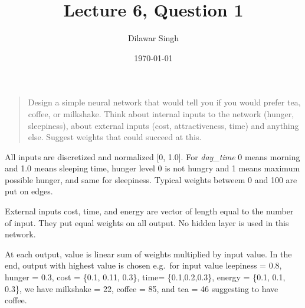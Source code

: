 \documentclass[]{article}
\title{Lecture 6, Question 1}
\author{Dilawar Singh}
\date{\today}
\begin{document}
\maketitle

\begin{quote}
Design a simple neural network that would tell you if you would prefer
tea, coffee, or milkshake. Think about internal inputs to the network
(hunger, sleepiness), about external inputs (cost, attractiveness, time)
and anything else. Suggest weights that could succeed at this.
\end{quote}

All inputs are discretized and normalized {[}0, 1.0{]}. For
\emph{day\_time} 0 means morning and 1.0 means sleeping time, hunger
level 0 is not hungry and 1 means maximum possible hunger, and same for
sleepiness. Typical weights betweem 0 and 100 are put on edges.

External inputs cost, time, and energy are vector of length equal to the
number of input. They put equal weights on all output. No hidden layer
is used in this network.

At each output, value is linear sum of weights multiplied by input
value. In the end, output with highest value is chosen e.g.~for input
value leepiness = 0.8, hunger = 0.3, cost = \{0.1, 0.11, 0.3\}, time=
\{0.1,0.2,0.3\}, energy = \{0.1, 0.1, 0.3\}, we have milkshake = 22,
coffee = 85, and tea = 46 suggesting to have coffee.

\end{document}
